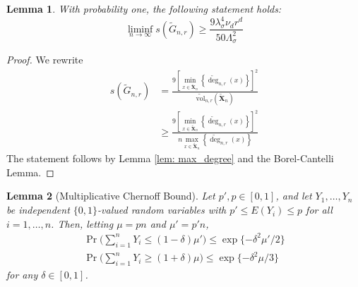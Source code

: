 \documentclass{article}
\newcommand{\set}[1]{\left\{#1\right\}}
\newcommand{\Xbf}{\mathbf{X}}
\newcommand{\1}{\mathbf{1}}
\newcommand{\vol}{\mathrm{vol}}
\theoremstyle{alden}
\theoremstyle{aldenthm}
\newtheorem{lemma}{Lemma}
\theoremstyle{remark}
\begin{document}
\begin{lemma}
	\label{lem: local_spread_lb}
	With probability one, the following statement holds:
	\begin{equation*}
	\liminf_{n \to \infty} s(\widetilde{G}_{n,r}) \geq \frac{9\lambda_{\sigma}^4 \nu_d r^d}{50\Lambda_{\sigma}^2} 
	\end{equation*}
\end{lemma}
\begin{proof}
	We rewrite
	\begin{align*}
	s(\widetilde{G}_{n,r}) & = \frac{9 \left[\min_{x \in \widetilde{\Xbf}_n}\set{\widetilde{\deg}_{n,r}(x)}\right]^2}{\widetilde{\vol}_{n,r}(\widetilde{\Xbf}_n)} \\
	& \geq \frac{9 \left[\min_{x \in \widetilde{\Xbf}_n}\set{\widetilde{\deg}_{n,r}(x)}\right]^2}{n \max_{x \in \widetilde{\Xbf}_n}\set{\widetilde{\deg}_{n,r}(x)}}
	\end{align*}
	The statement follows by Lemma \ref{lem: max_degree} and the Borel-Cantelli Lemma.
\end{proof}

\begin{lemma}[Multiplicative Chernoff Bound]
	\label{lem: multiplicative_chernoff_bound}
	Let $p', p \in [0,1]$, and let $Y_1, \ldots, Y_n$ be independent $\{0,1\}$-valued random variables with $p' \leq E(Y_i) \leq p$ for all $i = 1,\ldots,n$. Then, letting $\mu = pn$ and $\mu' = p'n$,
	\begin{align*}
	\Pr \biggl(\sum_{i = 1}^{n} {Y_i} \leq (1 - \delta)\mu' \biggr) \leq \exp\{-\delta^2 \mu' / 2\} \\
	\Pr \biggl(\sum_{i = 1}^{n} {Y_i} \geq (1 + \delta)\mu \biggr) \leq \exp\{-\delta^2 \mu / 3\}
	\end{align*}
	for any $\delta \in [0,1]$.
\end{lemma}
\end{document}
